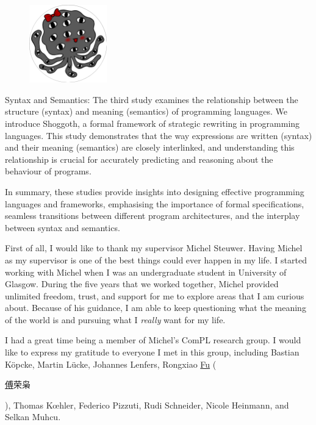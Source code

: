 \documentclass[phd,icsa,twoside,logo]{infthesis}
\begin{document}
\begin{preliminary}
\begin{laysummary}
\begin{figure}
  \vspace{-30pt}
  \begin{center}
    \includegraphics[width=0.3\textwidth]{Shoggoth.png}
  \end{center}
\end{figure}
Syntax and Semantics: The third study examines the relationship between the structure (syntax) and meaning (semantics) of programming languages. We introduce Shoggoth, a formal framework of strategic rewriting in programming languages. This study demonstrates that the way expressions are written (syntax) and their meaning (semantics) are closely interlinked, and understanding this relationship is crucial for accurately predicting and reasoning about the behaviour of programs.

In summary, these studies provide insights into designing effective programming languages and frameworks, emphasising the importance of formal specifications, seamless transitions between different program architectures, and the interplay between syntax and semantics.
\end{laysummary}


\begin{acknowledgements}
First of all, I would like to thank my supervisor Michel Steuwer. Having Michel as my supervisor is one of the best things could ever happen in my life. I started working with Michel when I was an undergraduate student in University of Glasgow. During the five years that we worked together, Michel provided unlimited freedom, trust, and support for me to explore areas that I am curious about. Because of his guidance, I am able to keep questioning what the meaning of the world is and pursuing what I \emph{really} want for my life.

I had a great time being a member of Michel’s ComPL research group. I would like to express my gratitude to everyone I met in this group, including Bastian K\"{o}pcke, Martin L\"{u}cke, Johannes Lenfers, Rongxiao \underline{Fu} (\begin{CJK*}{UTF8}{gbsn}\underline{傅}荣枭\end{CJK*}), Thomas K{\oe}hler, Federico Pizzuti, Rudi Schneider, Nicole Heinmann, and Selkan Muhcu.


\end{acknowledgements}
\end{preliminary}
\end{document}
